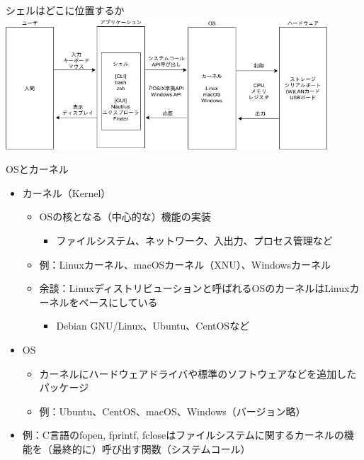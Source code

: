 \documentclass[12pt,aspectratio=169]{beamer}
\begin{document}
\begin{frame}{シェルはどこに位置するか}
  \centering
  \includegraphics[width=12cm,bb=0 0 741 281]{./images/shell.png}

\end{frame}


\begin{frame}{OSとカーネル}
  \begin{itemize}
    \item カーネル（Kernel）
      \begin{itemize}
        \item OSの核となる（中心的な）機能の実装
          \begin{itemize}
            \item ファイルシステム、ネットワーク、入出力、プロセス管理など
          \end{itemize}
        \item 例：Linuxカーネル、macOSカーネル（XNU）、Windowsカーネル
        \item 余談：Linuxディストリビューションと呼ばれるOSのカーネルはLinuxカーネルをベースにしている
          \begin{itemize}
            \item Debian GNU/Linux、Ubuntu、CentOSなど
          \end{itemize}
      \end{itemize}

      \item OS
        \begin{itemize}
          \item カーネルにハードウェアドライバや標準のソフトウェアなどを追加したパッケージ
          \item 例：Ubuntu、CentOS、macOS、Windows（バージョン略）
        \end{itemize}

      \item 例：C言語のfopen, fprintf, fcloseはファイルシステムに関するカーネルの機能を（最終的に）呼び出す関数（システムコール）
  \end{itemize}

\end{frame}
\end{document}
